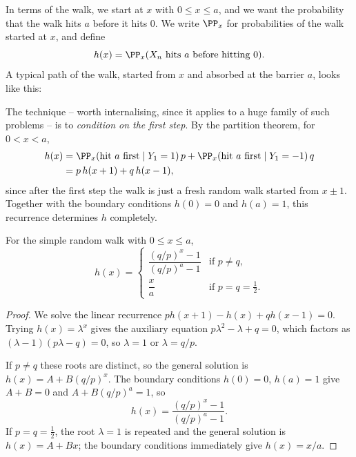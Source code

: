 In terms of the walk, we start at $x$ with $0 \leq x \leq a$, and we want the probability that the walk hits $a$ before it hits $0$. We write $\PP_x$ for probabilities of the walk started at $x$, and define
$$
h(x) = \PP_x(X_n \text{ hits } a \text{ before hitting } 0).
$$
A typical path of the walk, started from $x$ and absorbed at the barrier $a$, looks like this:
\begin{center}
\end{center}

The technique -- worth internalising, since it applies to a huge family of such problems -- is to \emph{condition on the first step}. By the partition theorem, for $0 < x < a$,
\begin{align*}
	h(x) &= \PP_x(\text{hit } a \text{ first} \mid Y_1 = 1)\,p + \PP_x(\text{hit } a \text{ first} \mid Y_1 = -1)\,q \\
	&= p\,h(x + 1) + q\,h(x - 1),
\end{align*}
since after the first step the walk is just a fresh random walk started from $x \pm 1$. Together with the boundary conditions $h(0) = 0$ and $h(a) = 1$, this recurrence determines $h$ completely.

\begin{theorem}
	For the simple random walk with $0 \leq x \leq a$,
	$$
	h(x) = \begin{cases}
		\dfrac{(q/p)^x - 1}{(q/p)^a - 1} & \text{if } p \neq q, \\[2ex]
		\dfrac{x}{a} & \text{if } p = q = \frac12.
	\end{cases}
	$$
\end{theorem}
\begin{proof}
	We solve the linear recurrence $p h(x+1) - h(x) + q h(x - 1) = 0$. Trying $h(x) = \lambda^x$ gives the auxiliary equation $p\lambda^2 - \lambda + q = 0$, which factors as $(\lambda - 1)(p\lambda - q) = 0$, so $\lambda = 1$ or $\lambda = q/p$.

	If $p \neq q$ these roots are distinct, so the general solution is $h(x) = A + B(q/p)^x$. The boundary conditions $h(0) = 0$, $h(a) = 1$ give $A + B = 0$ and $A + B(q/p)^a = 1$, so
	$$
	h(x) = \frac{(q/p)^x - 1}{(q/p)^a - 1}.
	$$
	If $p = q = \frac{1}{2}$, the root $\lambda = 1$ is repeated and the general solution is $h(x) = A + Bx$; the boundary conditions immediately give $h(x) = x/a$.
\end{proof}

